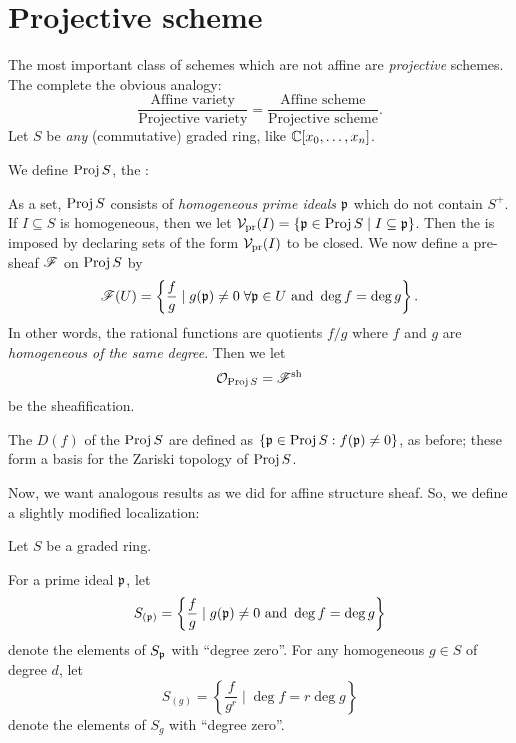 \section{Projective scheme}
The most important class of schemes which are not affine are
\emph{projective} schemes.
The complete the obvious analogy:
\[
	\frac{\text{Affine variety}}{\text{Projective variety}}
	=
	\frac{\text{Affine scheme}}{\text{Projective scheme}}.
\]
Let $S$ be \emph{any} (commutative) graded ring, like $\mathbb C[x_0, \dots, x_n]$.
\begin{definition}
	We define $\operatorname{Proj} S$, the :
	\begin{itemize}
		\ii As a set, $\operatorname{Proj} S$ consists of \emph{homogeneous prime ideals}
		$\mathfrak p$ which do not contain $S^+$.
		\ii If $I \subseteq S$ is homogeneous, then
		we let $\mathcal V_{\text{pr}}(I) = \{ \mathfrak p \in \operatorname{Proj} S \mid I \subseteq \mathfrak p \}$.
		Then the  is imposed by declaring
		sets of the form $\mathcal V_{\text{pr}}(I)$ to be closed.
		\ii We now define a pre-sheaf $\mathscr F$ on $\operatorname{Proj} S$ by
		\[ \mathscr F(U) =
			\left\{ \frac{f}{g} \mid
			g(\mathfrak p) \neq 0 \; \forall \mathfrak p \in U \text{ and }
			\deg f = \deg g \right\}.
		\]
		In other words, the rational functions are quotients $f/g$
		where $f$ and $g$ are \emph{homogeneous of the same degree}.
		Then we let \[ \mathcal O_{\operatorname{Proj} S} = \mathscr F^\mathrm{sh} \] be the sheafification.
	\end{itemize}
\end{definition}
\begin{definition}
	The  $D(f)$ of the $\operatorname{Proj} S$
	are defined as $\left\{ \mathfrak p \in \operatorname{Proj} S : f(\mathfrak p) \neq 0 \right\}$,
	as before; these form a basis for the Zariski topology of $\operatorname{Proj} S$.
\end{definition}
Now, we want analogous results as we did for affine structure sheaf.
So, we define a slightly modified localization:
\begin{definition}
	Let $S$ be a graded ring.
	\begin{enumerate}[(i)]
		\ii For a prime ideal $\mathfrak p$, let
		\[ S_{(\mathfrak p)} = \left\{ \frac fg \mid g(\mathfrak p) \neq 0 \text{ and }
			\deg f = \deg g \right\} \]
		denote the elements of $S_\mathfrak p$ with ``degree zero''.
		\ii For any homogeneous $g \in S$ of degree $d$, let
		\[ S_{(g)} = \left\{ \frac{f}{g^r} \mid
			\deg f = r \deg g \right\} \]
		denote the elements of $S_g$ with ``degree zero''.
	\end{enumerate}
\end{definition}


